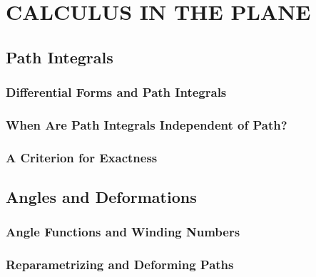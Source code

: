 \part{CALCULUS IN THE PLANE}

\chapter{Path Integrals}

\section{Differential Forms and Path Integrals}

\section{When Are Path Integrals Independent of Path?}

\section{A Criterion for Exactness}

\chapter{Angles and Deformations}

\section{Angle Functions and Winding Numbers}

\section{Reparametrizing and Deforming Paths}
